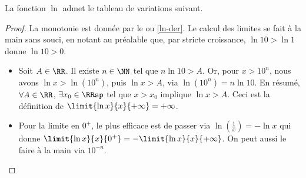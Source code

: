 \begin{fact} \label{ln-tab-var}
	La fonction $\ln$ admet le tableau de variations suivant.
	\begin{center}
	\end{center}
\end{fact}


\begin{proof}
	La monotonie est donnée par le  ou \ref{ln-der}.
	Le calcul des limites se fait à la main sans souci, en notant au préalable que, par stricte croissance, $\ln 10 > \ln 1$ donne $\ln 10 > 0$.
	\begin{itemize}
		\item Soit $A \in \RR$.
		Il existe $n \in \NN$ tel que $n \ln 10 > A$.
		Or, pour $x > 10^n$, nous avons $\ln x > \ln(10^n)$, puis $\ln x > A$, via $\ln(10^n) = n \ln 10$.
		En résumé,
		$\forall A \in \RR$, $\exists x_0 \in \RRsp$ tel que $x > x_0$ implique $\ln x > A$.
		Ceci est la définition de $\limit{\ln x}{x}{+ \infty} = +\infty$.
		
		\item Pour la limite en $0^+$, le plus efficace est de passer via $\ln(\frac1x) = - \ln x$ qui donne
		$\limit{\ln x}{x}{0^+} = - \limit{\ln x}{x}{+ \infty}$.
		On peut aussi le faire à la main via $10^{-n}$.
	\end{itemize}
	
	\null
	\vspace{-6ex}
\end{proof}

\vspace{1ex}
